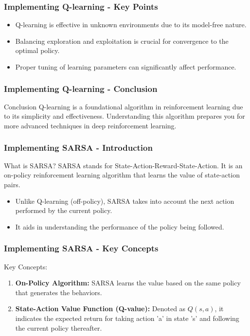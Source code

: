 \documentclass[aspectratio=169]{beamer}
\begin{document}
\begin{frame}
    \frametitle{Implementing Q-learning - Key Points}
    \begin{itemize}
        \item Q-learning is effective in unknown environments due to its model-free nature.
        \item Balancing exploration and exploitation is crucial for convergence to the optimal policy.
        \item Proper tuning of learning parameters can significantly affect performance.
    \end{itemize}
\end{frame}

\begin{frame}
    \frametitle{Implementing Q-learning - Conclusion}
    \begin{block}{Conclusion}
        Q-learning is a foundational algorithm in reinforcement learning due to its simplicity and effectiveness. Understanding this algorithm prepares you for more advanced techniques in deep reinforcement learning.
    \end{block}
\end{frame}

\begin{frame}[fragile]
    \frametitle{Implementing SARSA - Introduction}
    \begin{block}{What is SARSA?}
        SARSA stands for State-Action-Reward-State-Action. It is an on-policy reinforcement learning algorithm that learns the value of state-action pairs. 
    \end{block}
    \begin{itemize}
        \item Unlike Q-learning (off-policy), SARSA takes into account the next action performed by the current policy.
        \item It aids in understanding the performance of the policy being followed.
    \end{itemize}
\end{frame}

\begin{frame}[fragile]
    \frametitle{Implementing SARSA - Key Concepts}
    \begin{block}{Key Concepts:}
        \begin{enumerate}
            \item \textbf{On-Policy Algorithm:} SARSA learns the value based on the same policy that generates the behaviors.
            \item \textbf{State-Action Value Function (Q-value):} Denoted as $Q(s, a)$, it indicates the expected return for taking action 'a' in state 's' and following the current policy thereafter.
        \end{enumerate}
    \end{block}
\end{frame}
\end{document}
